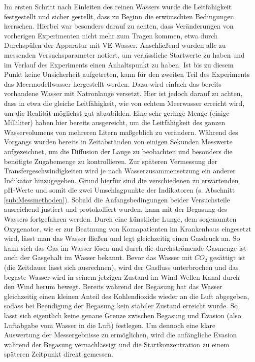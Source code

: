 \documentclass[12pt]{article}
\begin{document}
Im ersten Schritt nach Einleiten des reinen Wassers wurde die Leitfähigkeit festgestellt und sicher gestellt, dass zu Beginn die erwünschten Bedingungen herrschen. Hierbei war besonders darauf zu achten, dass Veränderungen von vorherigen Experimenten nicht mehr zum Tragen kommen, etwa durch Durchspülen der Apparatur mit VE-Wasser. Anschließend wurden alle zu messenden Versuchsparameter notiert, um verlässliche Startwerte zu haben und im Verlauf des Experiments einen Anhaltspunkt zu haben. 
Ist bis zu diesem Punkt keine Unsicherheit aufgetreten, kann für den zweiten Teil des Experiments das Meermodellwasser hergestellt werden. Dazu wird einfach das bereits vorhandene Wasser mit Natronlauge versetzt. 
Hier ist jedoch darauf zu achten, dass in etwa die gleiche Leitfähigkeit, wie von echtem Meerwasser erreicht wird, um die Realität möglichst gut abzubilden. Eine sehr geringe Menge (einige Milliliter) haben hier bereits ausgereicht, um die Leitfähigkeit des ganzen Wasservolumens von mehreren Litern maßgeblich zu verändern. 
Während des Vorgangs wurden bereits in Zeitabständen von einigen Sekunden Messwerte aufgezeichnet, um die Diffusion der Lauge zu beobachten und besonders die benötigte Zugabemenge zu kontrollieren. Zur späteren Vermessung der Transfergeschwindigkeiten wird je nach Wasserzusammensetzung ein anderer Indikator hinzugegeben. Grund hierfür sind die verschiedenen zu erwartenden pH-Werte und somit die zwei Umschlagpunkte der Indikatoren (s. Abschnitt \ref{sub:Messmethoden}).
Sobald die Anfangsbedingungen beider Versuchsteile ausreichend justiert und protokolliert wurden, kann mit der Begasung des Wassers fortgefahren werden. 
Durch eine künstliche Lunge, dem sogenannten Oxygenator, wie er zur Beatmung von Komapatienten im Krankenhaus eingesetzt wird, lässt man das Wasser fließen und legt gleichzeitig einen Gasdruck an. 
So kann sich das Gas im Wasser lösen und durch die durchströmende Gasmenge ist auch der Gasgehalt im Wasser bekannt. 
Bevor das Wasser mit $CO_2$ gesättigt ist (die Zeitdauer lässt sich ausrechnen), wird der Gasfluss unterbrochen und das begaste Wasser wird in seinem jetzigen Zustand im Wind-Wellen-Kanal durch den Wind herum bewegt. Bereits während der Begasung hat das Wasser gleichzeitig einen kleinen Anteil des Kohlendioxids wieder an die Luft abgegeben, sodass bei Beendigung der Begasung kein stabiler Zustand erreicht wurde. So lässt sich eigentlich keine genaue Grenze zwischen Begasung und Evasion (also Luftabgabe vom Wasser in die Luft) festlegen. Um dennoch eine klare Auswertung der Messergebnisse zu ermöglichen, wird die anfängliche Evasion während der Begasung vernachlässigt und die Startkonzentration zu einem späteren Zeitpunkt direkt gemessen.
\end{document}
